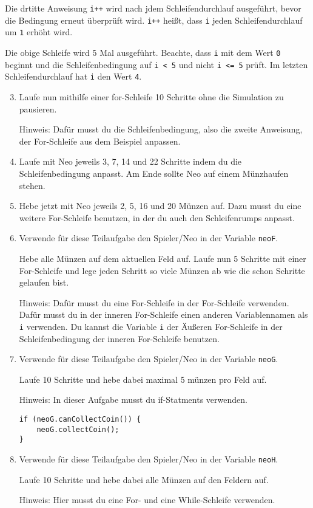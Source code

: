 \begin{Infobox}
	Die drtitte Anweisung \lstinline{i++} wird nach jdem Schleifendurchlauf ausgeführt, bevor die Bedingung erneut überprüft wird.
	\lstinline{i++} heißt, dass \lstinline{i} jeden Schleifendurchlauf um \lstinline{1} erhöht wird. 
	
	Die obige Schleife wird 5 Mal ausgeführt.
	Beachte, dass \lstinline{i} mit dem Wert \lstinline{0} beginnt und die Schleifenbedingung auf \lstinline{i < 5} und nicht \lstinline{i <= 5} prüft.
	Im letzten Schleifendurchlauf hat \lstinline{i} den Wert \lstinline{4}.
\end{Infobox}


\begin{enumerate}\setcounter{enumi}{2}
	\item 
		Laufe nun mithilfe einer for-Schleife 10 Schritte ohne die Simulation zu pausieren.

		Hinweis: Dafür musst du die Schleifenbedingung, also die zweite Anweisung, der For-Schleife aus dem Beispiel anpassen.

	\item
		Laufe mit Neo jeweils 3, 7, 14 und 22 Schritte indem du die Schleifenbedingung anpasst.
		Am Ende sollte Neo auf einem Münzhaufen stehen.

	\item
		Hebe jetzt mit Neo jeweils 2, 5, 16 und 20 Münzen auf.
		Dazu musst du eine weitere For-Schleife benutzen, in der du auch den Schleifenrumps anpasst.

	\item
		Verwende für diese Teilaufgabe den Spieler/Neo in der Variable \lstinline{neoF}.

		Hebe alle Münzen auf dem aktuellen Feld auf. 
		Laufe nun 5 Schritte mit einer For-Schleife und lege jeden Schritt so viele Münzen ab wie die schon Schritte gelaufen bist.

		Hinweis: Dafür musst du eine For-Schleife in der For-Schleife verwenden. 
		Dafür musst du in der inneren For-Schleife einen anderen Variablennamen als \lstinline{i} verwenden.
		Du kannst die Variable \lstinline{i} der Äußeren For-Schleife in der Schleifenbedingung der inneren For-Schleife benutzen.

	\item
		Verwende für diese Teilaufgabe den Spieler/Neo in der Variable \lstinline{neoG}.

		Laufe 10 Schritte und hebe dabei maximal 5 münzen pro Feld auf.

		Hinweis: In dieser Aufgabe musst du if-Statments verwenden.

		\begin{lstlisting}
if (neoG.canCollectCoin()) {
    neoG.collectCoin();
}
		\end{lstlisting}

	\item
		Verwende für diese Teilaufgabe den Spieler/Neo in der Variable \lstinline{neoH}.

		Laufe 10 Schritte und hebe dabei alle Münzen auf den Feldern auf.

		Hinweis: Hier musst du eine For- und eine While-Schleife verwenden.
\end{enumerate}
\newpage
